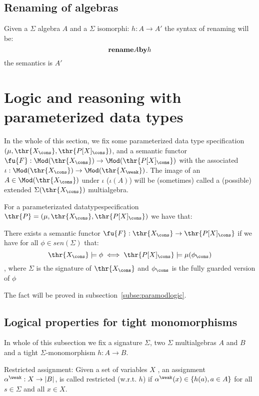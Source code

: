 \subsection{Renaming of algebras}
Given a $\Sigma$ algebra $A$ and a $\Sigma$ isomorphi: $h: A \to A'$ the syntax of renaming will be:
	\[ {\bf{ rename }} A {\bf{ by }} h \]
the semantics is $A'$




\section{Logic and reasoning with parameterized data types}
\label{se:paralogic}

In the whole of this section, we fix some parameterized data type specification
$(\mu,\thr{X_\cons},\thr{P[X]_\cons})$, and a semantic functor
$\fu{F}:\Mod(\thr{X_\cons}) \to \Mod(\thr{P[X]_\cons})$ with the associated
$\iota:\Mod(\thr{X_\cons})\to\Mod(\thr{X_\weak})$. The image of an
$A\in\Mod(\thr{X_\cons})$ under $\iota$ ($\iota(A)$) will be (sometimes)
called a (possible) extended $\Sigma(\thr{X_\cons})$ multialgebra.  


\begin{fact}
\label{fa:semanticexists}
For a parameterizated datatypespecification $\thr{P} = (\mu,\thr{X_\cons},\thr{P[X]_\cons})$ we have that:

There exists a semantic functor $\fu{F}: \thr{X_\cons} \to \thr{P[X]_\cons}$
	if we have for all $\phi \in sen(\Sigma)$ that: \[
	\thr{X_\cons}\models \phi \iff \thr{P[X]_\cons} \models
	\mu(\phi_\cons )\] , where $\Sigma$ is the signature of
	$\thr{X_\cons}$ and $\phi_\cons$ is the fully guarded version of
	$\phi$
\end{fact}
The fact will be proved in subsection~\ref{subse:paramodlogic}.


\subsection{Logical properties for tight monomorphisms}

In whole of this subsection we fix a signature $\Sigma$, two $\Sigma$ multialgebras $A$ and $B$ and a tight $\Sigma$-monomorphism $h:A \to B$.
\begin{definition}
Restricted assignment: Given a set of variables $X$
, an assignment $\alpha^{\weak}:X \to |B|$, is
called restricted (w.r.t. $h$) if $\alpha^{\weak}(x) \in \{ h(a), a\in A \}$ for
all $s \in \Sigma$ and all $x \in X$.
\end{definition}

